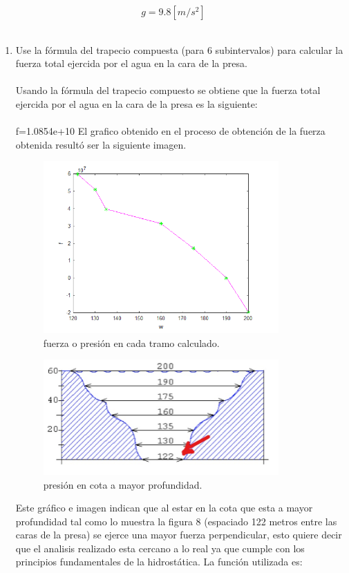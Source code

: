 \documentclass{udpreport}
\begin{document}
\begin{enumerate}
\begin{equation}
g=9.8[m/s^2]
\end{equation}
\\
 \begin{enumerate}
 \item Use la fórmula del trapecio compuesta (para 6 subintervalos) para calcular la fuerza total ejercida por el agua en la cara de la presa.
 \\ 
 \\
 Usando la fórmula del trapecio compuesto se obtiene que la fuerza total ejercida por el agua en la cara de la presa es la siguiente:
 \\
 \\
 f=1.0854e+10
\newpage
 El grafico obtenido en el proceso de obtención de la fuerza obtenida resultó ser la siguiente imagen.
 \begin{figure}[H]
    \centering
    \includegraphics[width=9cm]{fuerza_trap}
    \caption{fuerza o presión en cada tramo calculado.} \label{fig:fuerza_trap}
\end{figure}
 \begin{figure}[H]
    \centering
    \includegraphics[width=9cm]{presionfin}
    \caption{presión en cota a mayor profundidad.} \label{fig:presionfin}
\end{figure}
Este gráfico e imagen indican que al estar en la cota que esta a mayor profundidad tal como lo muestra la figura 8 (espaciado 122 metros entre las caras de la presa) se ejerce una mayor fuerza perpendicular, esto quiere decir que el analisis realizado esta cercano a lo real ya que cumple con los principios fundamentales de la hidrostática. 
La función utilizada es:
 

\end{enumerate}
\end{enumerate}
\end{document}
